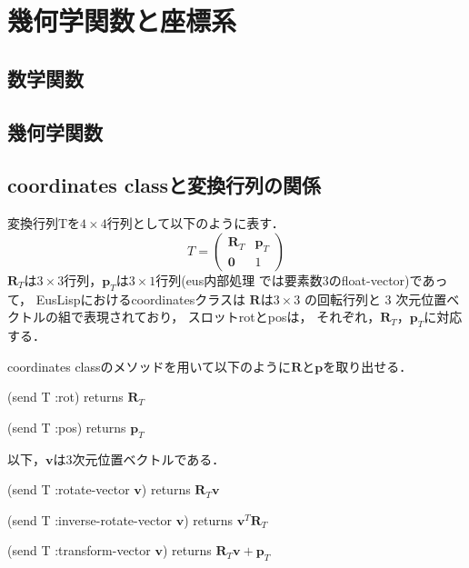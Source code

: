 \section{幾何学関数と座標系}

 \subsection{数学関数}
 

 \subsection{幾何学関数}
  

 \subsection{coordinates classと変換行列の関係}

\noindent
変換行列Tを$4\times4$行列として以下のように表す．
\[
T = \begin{pmatrix}
\mathbf{R}_T & \mathbf{p}_T \\
\mathbf{0} & 1
\end{pmatrix}
\]
$\mathbf{R}_T$は$3\times3$行列，$\mathbf{p}_T$は$3\times1$行列(eus内部処理
では要素数3のfloat-vector)であって，
EusLispにおけるcoordinatesクラスは
$\mathbf{R}$は$3\times3$ の回転行列と
3 次元位置ベクトルの組で表現されており，
スロットrotとposは，
それぞれ，$\mathbf{R}_T$，$\mathbf{p}_T$に対応する．

\vspace{1ex}

coordinates classのメソッドを用いて以下のように$\mathbf{R}$と$\mathbf{p}$を取り出せる．

\noindent
(send T :rot) returns $\mathbf{R}_T$

\noindent
(send T :pos) returns $\mathbf{p}_T$

\vspace{1ex}

以下，$\mathbf{v}$は3次元位置ベクトルである．

\noindent
(send T :rotate-vector $\mathbf{v}$) returns $\mathbf{R}_T \mathbf{v}$

\noindent
(send T :inverse-rotate-vector $\mathbf{v}$) returns $\mathbf{v}^T \mathbf{R}_T$

\noindent
(send T :transform-vector $\mathbf{v}$)
returns $\mathbf{R}_T\mathbf{v} + \mathbf{p}_T$

